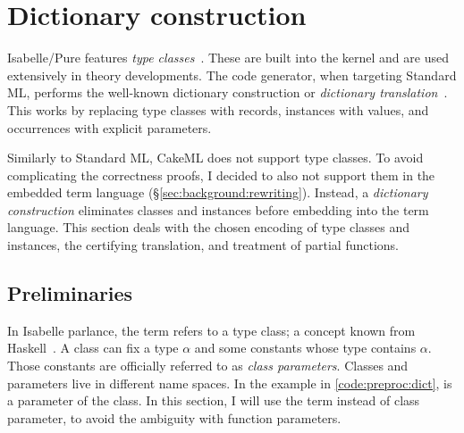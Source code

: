 
\section{Dictionary construction}
\label{sec:preproc:dict}


\noindent
Isabelle/Pure features \emph{type classes}~\cite{haftmann2007typeclasses,wenzel1997typeclasses}.
These are built into the kernel and are used extensively in theory developments.
The code generator, when targeting Standard ML, performs the well-known dictionary construction or \emph{dictionary translation}~\cite{haftmann2010codegeneration}.
This works by replacing type classes with records, instances with values, and occurrences with explicit parameters.

Similarly to Standard ML, CakeML does not support type classes.
To avoid complicating the correctness proofs, I decided to also not support them in the embedded term language (§\ref{sec:background:rewriting}).
Instead, a \emph{dictionary construction} eliminates classes and instances before embedding into the term language.
This section deals with the chosen encoding of type classes and instances, the certifying translation, and treatment of partial functions.

\subsection{Preliminaries}
\label{sec:preproc:dict:prelim}


In Isabelle parlance, the term  refers to a type class; a concept known from Haskell~\cite{wadler1989adhoc,haftmann2007typeclasses}.
A class can fix a type $\alpha$ and some constants whose type contains $\alpha$.
Those constants are officially referred to as \emph{class parameters}.
Classes and parameters live in different name spaces.
In the example in \cref{code:preproc:dict},  is a parameter of the  class.
In this section, I will use the term  instead of class parameter, to avoid the ambiguity with function parameters.

